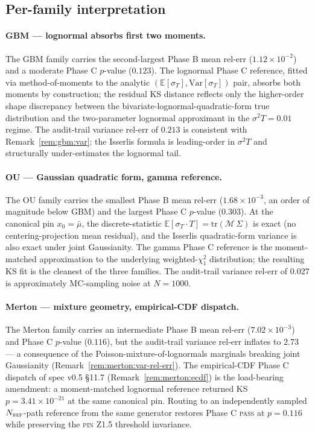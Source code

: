 \documentclass[11pt,letterpaper]{article}
\newcommand{\E}{\mathbb{E}}
\newcommand{\Var}{\text{Var}}
\newcommand{\sigmaT}{\sigma_{T}}
\newcommand{\centerProj}{\mathcal{M}}
\newcommand{\PinZ}[1]{\textsc{pin Z1.#1}}
\begin{document}
\subsection{Per-family interpretation}
\label{sec:results:interp}

\paragraph{GBM — lognormal absorbs first two moments.}
The GBM family carries the second-largest Phase B mean rel-err
($1.12 \times 10^{-2}$) and a moderate Phase C $p$-value ($0.123$).
The lognormal Phase C reference, fitted via method-of-moments to the
analytic $(\E[\sigmaT], \Var[\sigmaT])$ pair, absorbs both moments by
construction; the residual KS distance reflects only the higher-order
shape discrepancy between the bivariate-lognormal-quadratic-form true
distribution and the two-parameter lognormal approximant in the
$\sigma^{2}T = 0.01$ regime. The audit-trail variance rel-err of
$0.213$ is consistent with Remark~\ref{rem:gbm:var}: the Isserlis
formula is leading-order in $\sigma^{2}T$ and structurally
under-estimates the lognormal tail.

\paragraph{OU — Gaussian quadratic form, gamma reference.}
The OU family carries the smallest Phase B mean rel-err
($1.68 \times 10^{-3}$, an order of magnitude below GBM) and the
largest Phase C $p$-value ($0.303$). At the canonical pin
$x_{0} = \bar\mu$, the discrete-statistic
$\E[\sigmaT \cdot T] = \mathrm{tr}(\centerProj\,\Sigma)$ is exact
(no centering-projection mean residual), and the Isserlis quadratic-form
variance is also exact under joint Gaussianity. The gamma Phase C
reference is the moment-matched approximation to the underlying
weighted-$\chi^{2}_{1}$ distribution; the resulting KS fit is the
cleanest of the three families. The audit-trail variance rel-err of
$0.027$ is approximately MC-sampling noise at $N = 1000$.

\paragraph{Merton — mixture geometry, empirical-CDF dispatch.}
The Merton family carries an intermediate Phase B mean rel-err
($7.02 \times 10^{-3}$) and Phase C $p$-value ($0.116$), but the
audit-trail variance rel-err inflates to $2.73$ — a consequence of
the Poisson-mixture-of-lognormals marginals breaking joint Gaussianity
(Remark~\ref{rem:merton:var-rel-err}). The empirical-CDF Phase C
dispatch of spec v0.5 \S11.7 (Remark~\ref{rem:merton:ecdf}) is the
load-bearing amendment: a moment-matched lognormal reference returned
KS $p = 3.41 \times 10^{-21}$ at the same canonical pin. Routing to
an independently sampled $N_{\textsc{ref}}$-path reference from the
same generator restores Phase C \textsc{pass} at $p = 0.116$ while
preserving the \PinZ{5} threshold invariance.
\end{document}
